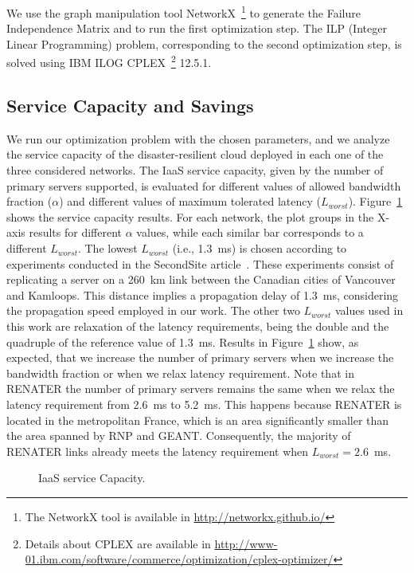 \documentclass[preprint]{elsarticle}
\begin{document}
We use the graph manipulation tool NetworkX~\footnote{The NetworkX tool is available in \url{http://networkx.github.io/}} to generate the Failure Independence Matrix and to run the first optimization step. The ILP (Integer Linear Programming) problem, corresponding to the second optimization step, is solved using IBM ILOG CPLEX~\footnote{Details about CPLEX are available in \url{http://www-01.ibm.com/software/commerce/optimization/cplex-optimizer/}} 12.5.1.

\subsection{Service Capacity and Savings}

We run our optimization problem with the chosen parameters, and we analyze the service capacity of the disaster-resilient cloud deployed in each one of the three considered networks. The IaaS service capacity, given by the number of primary servers supported, is evaluated for different values of allowed bandwidth fraction ($\alpha$) and different values of maximum tolerated latency ($L_{worst}$). 
Figure~\ref{zeroRPOfig:totalNrServers} shows the service capacity results. For each network, the plot groups in the X-axis results for different $\alpha$ values, while each similar bar corresponds to a different $L_{worst}$. The lowest $L_{worst}$ (i.e., 1.3~ms) is chosen according to experiments conducted in the SecondSite article~\cite{rajagopalan2012secondsite}. These experiments consist of replicating a server on a 260~km link between the Canadian cities of Vancouver and Kamloops. This distance implies a propagation delay of 1.3~ms, considering the propagation speed employed in our work. The other two $L_{worst}$ values used in this work are relaxation of the latency requirements, being the double and the quadruple of the reference value of 1.3~ms.
Results in Figure~\ref{zeroRPOfig:totalNrServers} show, as expected, that we increase the number of primary servers when we increase the bandwidth fraction or when we relax latency requirement. Note that in RENATER the number of primary servers remains the same when we relax the latency requirement from 2.6~ms to 5.2~ms. This happens because RENATER is located in the metropolitan France, which is an area significantly smaller than the area spanned by RNP and GEANT. Consequently, the majority of RENATER links already meets the latency requirement when $L_{worst}=2.6$~ms.
\begin{figure}[ht!]
\centering
{}
\caption{IaaS service Capacity.}
\label{zeroRPOfig:totalNrServers}
\end{figure}
\end{document}
